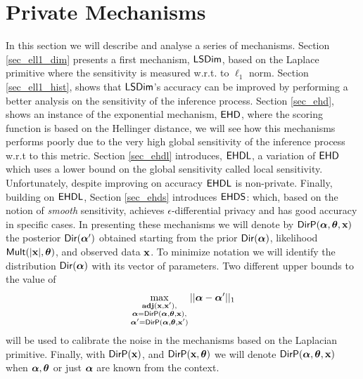 \documentclass{article}
\begin{document}
\section{Private Mechanisms}
\label{sec_mechs}
In this section we will describe and analyse a series of mechanisms.
Section \ref{sec_ell1_dim} presents a first mechanism, $\mathsf{LSDim}$,
based on the Laplace primitive where the sensitivity is measured w.r.t. to $\ell_1$ norm.
Section \ref{sec_ell1_hist}, shows that $\mathsf{LSDim}$'s accuracy can be improved
by performing a better analysis on the sensitivity of the inference process.
Section \ref{sec_ehd}, shows an instance of the exponential mechanism, $\mathsf{EHD}$, where the scoring
function is based on the Hellinger distance, we will see how this mechanisms performs
poorly due to the very high global sensitivity of the inference process w.r.t to this metric.
Section \ref{sec_ehdl} introduces, $\mathsf{EHDL}$, a variation of $\mathsf{EHD}$ which uses a lower bound
on the global sensitivity called local sensitivity.
Unfortunately, despite improving on accuracy $\mathsf{EHDL}$ is non-private.
Finally, building on $\mathsf{EHDL}$, Section \ref{sec_ehds} introduces $\mathsf{EHDS}$:
which, based on the notion of \emph{smooth} sensitivity, achieves $\epsilon$-differential privacy and
has good accuracy in specific cases.
In presenting these mechanisms we will denote by $\mathsf{DirP}(\boldsymbol{\alpha},\boldsymbol{\theta},\textbf{x})$ the posterior  $\mathsf{Dir}(\boldsymbol{\alpha}')$
obtained starting from the prior $\mathsf{Dir}(\boldsymbol{\alpha})$, likelihood $\mathsf{Mult}(|\textbf{x}|, \boldsymbol{\theta})$, and observed data $\textbf{x}$.
To minimize notation we will identify the distribution $\mathsf{Dir}(\boldsymbol{\alpha})$ with its vector
of parameters.
Two different upper bounds to the value of
\begin{align}
  \label{eqn:eq1}
  \max_{\substack{\textbf{adj}(\textbf{x},\textbf{x}'),\\
      \boldsymbol{\alpha}=\mathsf{DirP}(\boldsymbol{\alpha},\boldsymbol{\theta},\textbf{x}),\\
      \boldsymbol{\alpha}'=\mathsf{DirP}(\boldsymbol{\alpha},\boldsymbol{\theta},\textbf{x}')}}||\boldsymbol{\alpha}-\boldsymbol{\alpha}'||_1 
\end{align}
will be used to calibrate the noise in the mechanisms based on the Laplacian primitive.
Finally, with $\mathsf{DirP}(\textbf{x})$, and $\mathsf{DirP}(\textbf{x},\boldsymbol{\theta})$ we will denote $\mathsf{DirP}(\boldsymbol{\alpha},\boldsymbol{\theta},\textbf{x})$ when $\boldsymbol{\alpha}, \boldsymbol{\theta}$ or just $\boldsymbol{\alpha}$
are known from the context.
\end{document}

